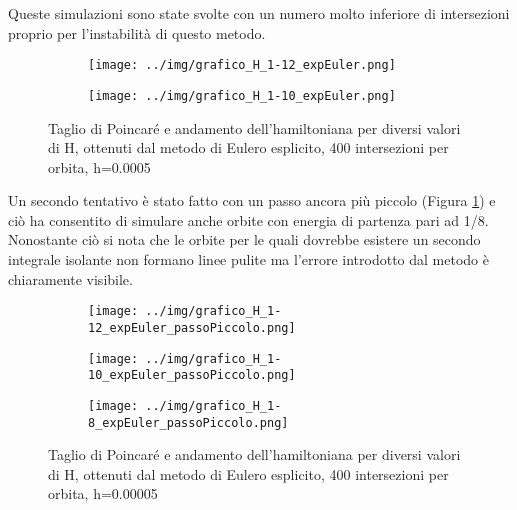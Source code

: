 \documentclass[a4paper]{article}
\numberwithin{equation}{section}
\numberwithin{figure}{section}
\begin{document}
Queste simulazioni sono state svolte con un numero molto inferiore di intersezioni proprio per
l'instabilità di questo metodo.

\begin{figure}[h!]
	\centering
	\begin{subfigure}[t]{.49\textwidth}
		\centering
		\texttt{[image: ../img/grafico\_H\_1-12\_expEuler.png]}
	\end{subfigure}
	\begin{subfigure}[t]{.49\textwidth}
		\centering
		\texttt{[image: ../img/grafico\_H\_1-10\_expEuler.png]}
	\end{subfigure}

	\caption{Taglio di Poincaré e andamento dell'hamiltoniana per diversi valori di H,
	ottenuti dal metodo di Eulero esplicito, 400 intersezioni per orbita, h=0.0005}
\end{figure}

Un secondo tentativo è stato fatto con un passo ancora più piccolo
(Figura \ref{img:euleroesplicitopiccolo}) e ciò ha consentito di simulare anche
orbite con energia di partenza pari ad 1/8. Nonostante ciò si nota che le orbite per le
quali dovrebbe esistere un secondo integrale isolante non formano linee pulite ma l'errore
introdotto dal metodo è chiaramente visibile.

\begin{figure}[h!]
	\centering
	\begin{subfigure}[t]{.49\textwidth}
		\centering
		\texttt{[image: ../img/grafico\_H\_1-12\_expEuler\_passoPiccolo.png]}
	\end{subfigure}
	\begin{subfigure}[t]{.49\textwidth}
		\centering
		\texttt{[image: ../img/grafico\_H\_1-10\_expEuler\_passoPiccolo.png]}
	\end{subfigure}
	\begin{subfigure}[t]{.49\textwidth}
		\centering
		\texttt{[image: ../img/grafico\_H\_1-8\_expEuler\_passoPiccolo.png]}
	\end{subfigure}

	\caption{Taglio di Poincaré e andamento dell'hamiltoniana per diversi valori di H,
	ottenuti dal metodo di Eulero esplicito, 400 intersezioni per orbita, h=0.00005}
	\label{img:euleroesplicitopiccolo}
\end{figure}

\clearpage
\printbibliography
\end{document}
